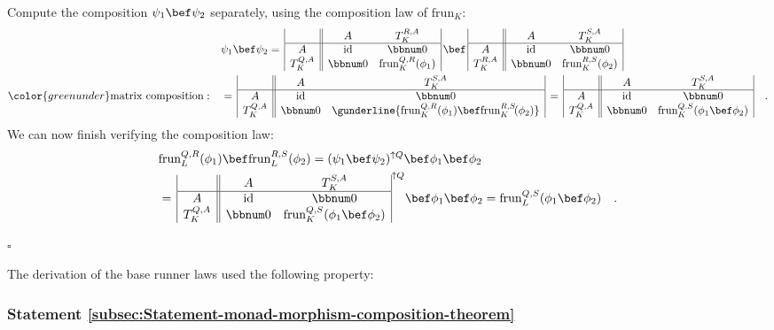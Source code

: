 Compute the composition $\psi_{1}\bef\psi_{2}$ separately, using
the composition law of $\text{frun}_{K}$:
\begin{align*}
 & \psi_{1}\bef\psi_{2}=\,\begin{array}{|c||cc|}
 & A & T_{K}^{R,A}\\
\hline A & \text{id} & \bbnum 0\\
T_{K}^{Q,A} & \bbnum 0 & \text{frun}_{K}^{Q,R}(\phi_{1})
\end{array}\,\bef\,\begin{array}{|c||cc|}
 & A & T_{K}^{S,A}\\
\hline A & \text{id} & \bbnum 0\\
T_{K}^{R,A} & \bbnum 0 & \text{frun}_{K}^{R,S}(\phi_{2})
\end{array}\\
{\color{greenunder}\text{matrix composition}:}\quad & =\,\begin{array}{|c||cc|}
 & A & T_{K}^{S,A}\\
\hline A & \text{id} & \bbnum 0\\
T_{K}^{Q,A} & \bbnum 0 & \gunderline{\text{frun}_{K}^{Q,R}(\phi_{1})\bef\text{frun}_{K}^{R,S}\!(\phi_{2})}
\end{array}\,=\,\begin{array}{|c||cc|}
 & A & T_{K}^{S,A}\\
\hline A & \text{id} & \bbnum 0\\
T_{K}^{Q,A} & \bbnum 0 & \text{frun}_{K}^{Q,S}(\phi_{1}\bef\phi_{2})
\end{array}\quad.
\end{align*}
We can now finish verifying the composition law:
\begin{align*}
 & \text{frun}_{L}^{Q,R}(\phi_{1})\bef\text{frun}_{L}^{R,S}(\phi_{2})=(\psi_{1}\bef\psi_{2})^{\uparrow Q}\bef\phi_{1}\bef\phi_{2}\\
 & =\,\begin{array}{|c||cc|}
 & A & T_{K}^{S,A}\\
\hline A & \text{id} & \bbnum 0\\
T_{K}^{Q,A} & \bbnum 0 & \text{frun}_{K}^{Q,S}(\phi_{1}\bef\phi_{2})
\end{array}^{\uparrow Q}\bef\phi_{1}\bef\phi_{2}=\text{frun}_{L}^{Q,S}(\phi_{1}\bef\phi_{2})\quad.
\end{align*}

$\square$

The derivation of the base runner laws used the following property:

\subsubsection{Statement \label{subsec:Statement-monad-morphism-composition-theorem}\ref{subsec:Statement-monad-morphism-composition-theorem}}

